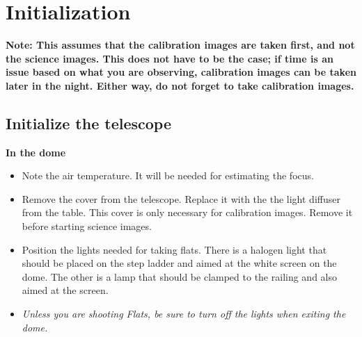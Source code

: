 \documentclass[letterpaper, 12pt]{report}
\begin{document}
\newpage



\chapter{Initialization}\label{ch:initialization}
\textbf{Note: This assumes that the calibration images are taken first, and not the science images. This does not have to be the case; if time is an issue based on what you are observing, calibration images can be taken later in the night. Either way, do not forget to take calibration images.} \\

\section{Initialize the telescope}


{\large\textbf{In the dome}}
\begin{itemize}
	\item Note the air temperature. It will be needed for estimating the focus.
	\item Remove the cover from the telescope. Replace it with the the light diffuser from the table. This cover is only necessary for calibration images. Remove it before starting science images.
	\item Position the lights needed for taking flats. There is a halogen light that should be placed on the step ladder and aimed at the white screen on the dome. The other is a lamp that should be clamped to the railing and also aimed at the screen.
	\item \emph{Unless you are shooting Flats, be sure to turn off the lights when exiting the dome.}
\end{itemize}
\end{document}
